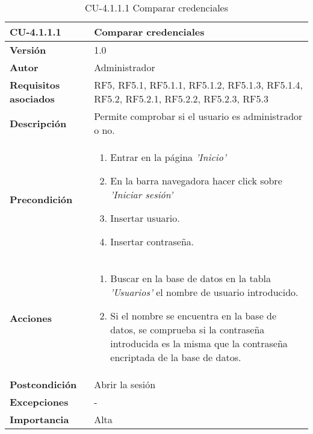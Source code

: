 \begin{table}[h!]
	\centering
	\begin{tabularx}{\linewidth}{ p{} p{} }
		\toprule
		\textbf{CU-4.1.1.1}    & \textbf{Comparar credenciales}\\
		\toprule
		\textbf{Versión}              & 1.0    \\
		\textbf{Autor}                & Administrador \\
		\textbf{Requisitos asociados} & RF5, RF5.1, RF5.1.1, RF5.1.2, RF5.1.3, RF5.1.4, RF5.2, RF5.2.1, RF5.2.2, RF5.2.3, RF5.3\\
		\textbf{Descripción}          & Permite comprobar si el usuario es administrador o no.\\
        \textbf{Precondición}         &  
  		\begin{enumerate}
			\def\labelenumi{\arabic{enumi}.}
			\tightlist
			\item Entrar en la página \textit{'Inicio'}
			\item En la barra navegadora hacer click sobre \textit{'Iniciar sesión'}
                \item Insertar usuario.
                \item Insertar contraseña.
		\end{enumerate}\\
		\textbf{Acciones}             &
		\begin{enumerate}
			\def\labelenumi{\arabic{enumi}.}
			\tightlist
			\item Buscar en la base de datos en la tabla \textit{'Usuarios'} el nombre de usuario introducido.
   			\item Si el nombre se encuentra en la base de datos, se comprueba si la contraseña introducida es la misma que la contraseña encriptada de la base de datos.
		\end{enumerate}\\
		\textbf{Postcondición}     &   Abrir la sesión \\
		\textbf{Excepciones}          & - \\
		\textbf{Importancia}          & Alta \\
		\bottomrule
	\end{tabularx}
	\caption{CU-4.1.1.1 Comparar credenciales}
\end{table}

